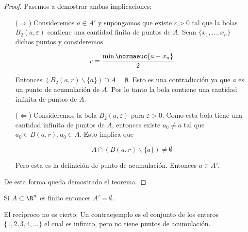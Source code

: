 \begin{proof}
    Pasemos a demostrar ambas implicaciones:
    
    \begin{enumerate}
        \item[($\Rightarrow$)] Consideremos $a \in A'$ y supongamos que existe $\varepsilon > 0$ tal que la bolas $B_2(a, \varepsilon)$ contiene una cantidad finita de puntos de $A$. Sean $\{x_1, \dots, x_n\}$ dichos puntos y consideremos
        
        \[
        r = \frac{\min \normaeuc{a - x_n}}{2}
        \]
        
        Entonces $\left( B_2(a, r) \backslash \{a\} \right) \cap A = \emptyset$. Esto es una contradicción ya que $a$ es un punto de acumulación de $A$. Por lo tanto la bola contiene una cantidad infinita de puntos de $A$.
        
        \item[($\Leftarrow$)] Consideremos la bola $B_2(a, \varepsilon)$ para $\varepsilon > 0$. Como esta bola tiene una cantidad infinita de puntos de $A$, entonces existe $a_0 \neq a$ tal que $a_0 \in B(a,r), a_0 \in A$. Esto implica que
        
        \[
        A \cap \left( B(a,r) \backslash \{a\} \right) \neq \emptyset
        \]
        
        Pero esta es la definición de punto de acumulación. Entonces $a \in A'$.
    \end{enumerate}
    
    De esta forma queda demostrado el teorema.
\end{proof}

\begin{cor}
    Si $A \subset \R^n$ es finito entonces $A' = \emptyset$.
\end{cor}

\begin{aco}
    El recíproco no es cierto: Un contraejemplo es el conjunto de los enteros $\{1, 2, 3, 4, \dots\}$ el cual es infinito, pero no tiene puntos de acumulación.
\end{aco}